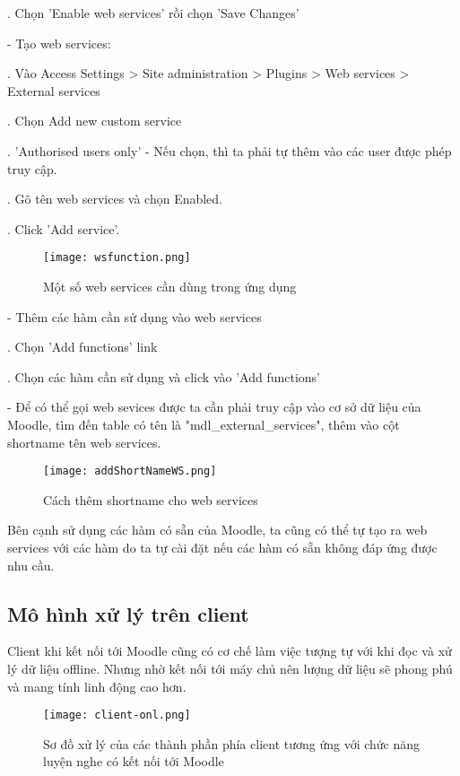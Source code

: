 . Chọn 'Enable web services' rồi chọn 'Save Changes'

- Tạo web services:

. Vào Access Settings > Site administration > Plugins > Web services > External services

. Chọn Add new custom service

. 'Authorised users only' - Nếu chọn, thì ta phải tự thêm vào các user được phép truy cập.
 
. Gõ tên web services và chọn Enabled.

. Click 'Add service'.

\begin{figure}[!htb] 
\centering
\texttt{[image: wsfunction.png]}
\caption{Một số web services cần dùng trong ứng dụng}
\end{figure}

- Thêm các hàm cần sử dụng vào web services

. Chọn 'Add functions' link

. Chọn các hàm cần sử dụng và click vào 'Add functions'

- Để có thể gọi web sevices được ta cần phải truy cập vào cơ sở dữ liệu của Moodle, tìm đến table có tên là "mdl\_external\_services", thêm vào cột shortname tên web services.

\begin{figure}[!htb] 
\centering
\texttt{[image: addShortNameWS.png]}
\caption{Cách thêm shortname cho web services}
\end{figure}
 
Bên cạnh sử dụng các hàm có sẵn của Moodle, ta cũng có thể tự tạo ra web services với các hàm do ta tự cài đặt nếu các hàm có sẵn không đáp ứng được nhu cầu.

\subsection{Mô hình xử lý trên client}

Client khi kết nối tới Moodle cũng có cơ chế làm việc tượng tự với khi đọc và xử lý dữ liệu offline. Nhưng nhờ kết nối tới máy chủ nên lượng dữ liệu sẽ phong phú và mang tính linh động cao hơn.

\begin{figure}[!htb] 
\centering
\texttt{[image: client-onl.png]}
\caption{Sơ đồ xử lý của các thành phần phía client tương ứng với chức năng luyện nghe có kết nối tới Moodle}
\end{figure}

